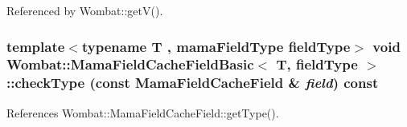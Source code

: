 Referenced by Wombat::getV().\hypertarget{classWombat_1_1MamaFieldCacheFieldBasic_ab5400d3050c6a946a1ccf111e88eee72}{
\subsubsection[{checkType}]{\setlength{\rightskip}{0pt plus 5cm}template$<$typename T , mamaFieldType fieldType$>$ void {\bf Wombat::MamaFieldCacheFieldBasic}$<$ T, fieldType $>$::checkType (const {\bf MamaFieldCacheField} \& {\em field}) const}}
\label{classWombat_1_1MamaFieldCacheFieldBasic_ab5400d3050c6a946a1ccf111e88eee72}


References Wombat::MamaFieldCacheField::getType().